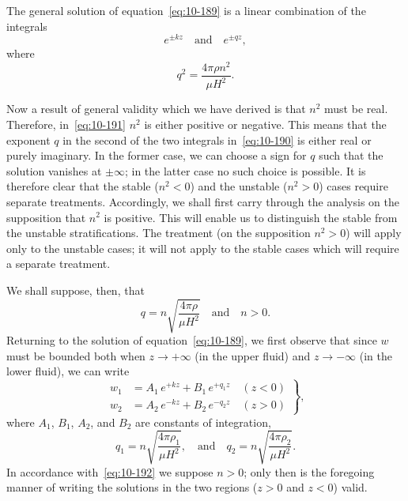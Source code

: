 The general solution of equation~\eqref{eq:10-189} is a linear combination of the integrals
\begin{equation}
\label{eq:10-190}
e^{\pm kz} \quad\text{and}\quad e^{\pm qz},
\end{equation}
where
\begin{equation}
\label{eq:10-191}
q^2 = \frac{4\pi\rho n^2}{\mu H^2}.
\end{equation}

Now a result of general validity which we have derived is that $n^2$ must be real. Therefore, in~\eqref{eq:10-191} $n^2$ is either positive or negative. This means that the exponent $q$ in the second of the two integrals in~\eqref{eq:10-190} is either real or purely imaginary. In the former case, we can choose a sign for $q$ such that the solution vanishes at $\pm\infty$; in the latter case no such choice is possible. It is therefore clear that the stable ($n^2 < 0$) and the unstable ($n^2 > 0$) cases require separate treatments. Accordingly, we shall first carry through the analysis on the supposition that $n^2$ is positive. This will enable us to distinguish the stable from the unstable stratifications. The treatment (on the supposition $n^2 > 0$) will apply only to the unstable cases; it will not apply to the stable cases which will require a separate treatment.

We shall suppose, then, that
\begin{equation}
\label{eq:10-192}
q = n\sqrt{\frac{4\pi\rho}{\mu H^2}} \quad\text{and}\quad n > 0.
\end{equation}
Returning to the solution of equation~\eqref{eq:10-189}, we first observe that since $w$ must be bounded both when $z \to +\infty$ (in the upper fluid) and $z \to -\infty$ (in the lower fluid), we can write
\begin{equation}
\label{eq:10-193}
\left.
\begin{aligned}
w_1 &= A_1\,e^{+kz}+B_1\,e^{+q_1 z} \quad (z < 0) \\
w_2 &= A_2\,e^{-kz}+B_2\,e^{-q_2 z} \quad (z > 0)
\end{aligned}
\right\}\!,
\end{equation}
where $A_1$, $B_1$, $A_2$, and $B_2$ are constants of integration,
\begin{equation}
\label{eq:10-194}
q_1 = n\sqrt{\frac{4\pi\rho_1}{\mu H^2}}, \quad\text{and}\quad q_2 = n\sqrt{\frac{4\pi\rho_2}{\mu H^2}}.
\end{equation}
In accordance with~\eqref{eq:10-192} we suppose $n > 0$; only then is the foregoing manner of writing the solutions in the two regions ($z > 0$ and $z < 0$) valid.

